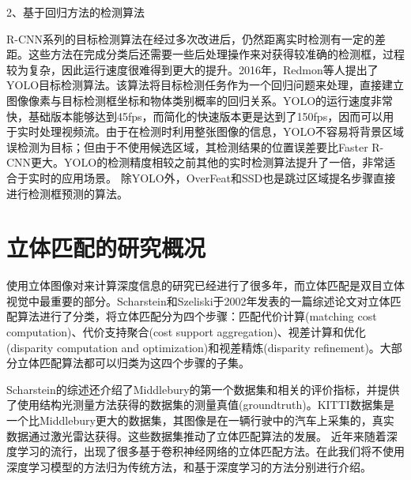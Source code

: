 2、基于回归方法的检测算法

R-CNN系列的目标检测算法在经过多次改进后，仍然距离实时检测有一定的差距。这些方法在完成分类后还需要一些后处理操作来对获得较准确的检测框，过程较为复杂，因此运行速度很难得到更大的提升。2016年，Redmon等人提出了YOLO目标检测算法\cite{redmon2016you}。该算法将目标检测任务作为一个回归问题来处理，直接建立图像像素与目标检测框坐标和物体类别概率的回归关系。YOLO的运行速度非常快，基础版本能够达到45fps，而简化的快速版本更是达到了150fps，因而可以用于实时处理视频流。由于在检测时利用整张图像的信息，YOLO不容易将背景区域误检测为目标；但由于不使用候选区域，其检测结果的位置误差要比Faster R-CNN更大。YOLO的检测精度相较之前其他的实时检测算法提升了一倍，非常适合于实时的应用场景。
除YOLO外，OverFeat\cite{sermanet2013overfeat}和SSD\cite{liu2016ssd}也是跳过区域提名步骤直接进行检测框预测的算法。


\section{立体匹配的研究概况}

使用立体图像对来计算深度信息的研究已经进行了很多年\cite{Barnard1982}，而立体匹配是双目立体视觉中最重要的部分。Scharstein和Szeliski于2002年发表的一篇综述论文\cite{Scharstein2002}对立体匹配算法进行了分类，将立体匹配分为四个步骤：匹配代价计算(matching cost computation)、代价支持聚合(cost support aggregation)、视差计算和优化(disparity computation and optimization)和视差精炼(disparity refinement)。大部分立体匹配算法都可以归类为这四个步骤的子集。

Scharstein的综述还介绍了Middlebury的第一个数据集和相关的评价指标，并提供了使用结构光测量方法获得的数据集的测量真值(groundtruth)。KITTI数据集\cite{Geiger2012,Menze_2015_CVPR}是一个比Middlebury更大的数据集，其图像是在一辆行驶中的汽车上采集的，真实数据通过激光雷达获得。这些数据集推动了立体匹配算法的发展。
近年来随着深度学习的流行，出现了很多基于卷积神经网络的立体匹配方法。在此我们将不使用深度学习模型的方法归为传统方法，和基于深度学习的方法分别进行介绍。

